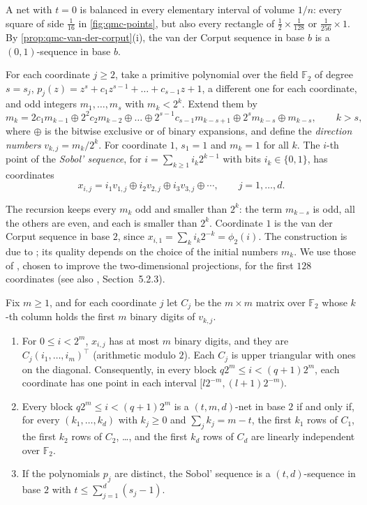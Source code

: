 A net with $t=0$ is balanced in every elementary interval of volume $1/n$: every square of
side $\frac1{16}$ in \cref{fig:qmc-points}, but also every rectangle of $\frac12\times\frac1{128}$
or $\frac1{256}\times1$. By \cref{prop:qmc-van-der-corput}(i), the van der Corput sequence in
base $b$ is a $(0,1)$-sequence in base $b$.

\begin{definition}\label{def:qmc-sobol}
For each coordinate $j\ge2$, take a primitive polynomial over the field $\mathbb F_2$ of
degree $s=s_j$, $p_j(z)=z^s+c_1z^{s-1}+\dots+c_{s-1}z+1$, a different one for each coordinate,
and odd integers $m_1,\dots,m_s$
with $m_k<2^k$. Extend them by
\[
  m_k=2c_1m_{k-1}\oplus2^2c_2m_{k-2}\oplus\dots\oplus2^{s-1}c_{s-1}m_{k-s+1}\oplus2^sm_{k-s}
  \oplus m_{k-s},\qquad k>s,
\]
where $\oplus$ is the bitwise exclusive or of binary expansions, and define the
\emph{direction numbers} $v_{k,j}=m_k/2^k$. For coordinate $1$, $s_1=1$ and $m_k=1$ for all $k$.
The $i$-th point of the \emph{Sobol' sequence}, for $i=\sum_{k\ge1}i_k2^{k-1}$ with bits
$i_k\in\{0,1\}$, has coordinates
\[
  x_{i,j}=i_1v_{1,j}\oplus i_2v_{2,j}\oplus i_3v_{3,j}\oplus\cdots,\qquad j=1,\dots,d.
\]
\end{definition}

The recursion keeps every $m_k$ odd and smaller than $2^k$: the term $m_{k-s}$ is odd, all
the others are even, and each is smaller than $2^k$. Coordinate $1$ is the van der Corput
sequence in base $2$, since $x_{i,1}=\sum_ki_k2^{-k}=\phi_2(i)$. The construction is due to
\textcite{sobol-1967}; its quality depends on the choice of the initial numbers $m_k$. We use
those of \textcite{joe-kuo-2008}, chosen to improve the two-dimensional projections, for the
first $128$ coordinates (see also \textcite{glasserman-mc}, Section~5.2.3).

\begin{proposition}\label{prop:qmc-digital-net}
Fix $m\ge1$, and for each coordinate $j$ let $C_j$ be the $m\times m$ matrix over
$\mathbb F_2$ whose $k$-th column holds the first $m$ binary digits of $v_{k,j}$.
\begin{enumerate}[label=(\roman*)]
  \item For $0\le i<2^m$, $x_{i,j}$ has at most $m$ binary digits, and they are
    $C_j(i_1,\dots,i_m)^\top$ (arithmetic modulo $2$). Each $C_j$ is upper triangular with
    ones on the diagonal. Consequently, in every block $q2^m\le i<(q+1)2^m$, each coordinate
    has one point in each interval $[l2^{-m},(l+1)2^{-m})$.
  \item Every block $q2^m\le i<(q+1)2^m$ is a $(t,m,d)$-net in base $2$ if and only if, for every
    $(k_1,\dots,k_d)$ with $k_j\ge0$ and $\sum_jk_j=m-t$, the first $k_1$ rows of $C_1$, the first
    $k_2$ rows of $C_2$, \dots, and the first $k_d$ rows of $C_d$ are linearly independent over
    $\mathbb F_2$.
  \item If the polynomials $p_j$ are distinct, the Sobol' sequence is a $(t,d)$-sequence in base
    $2$ with $t\le\sum_{j=1}^d(s_j-1)$.
\end{enumerate}
\end{proposition}

